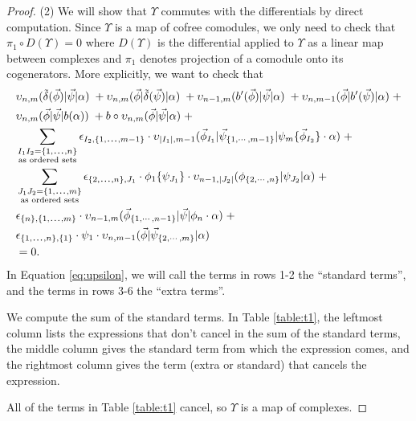 \begin{proof}
(2) We will show that $\Upsilon$ commutes with 
the differentials by direct computation. Since 
$\Upsilon$ is a map of cofree comodules, we only 
need to check that $\pi_1 \circ D(\Upsilon) = 0$ 
where $D(\Upsilon)$ is the differential applied 
to $\Upsilon$ as a linear map between complexes 
and $\pi_1$ denotes projection of a comodule 
onto its cogenerators. More explicitly, we want 
to check that
\begin{equation} \label{eq:upsilon}
\begin{aligned}
&\upsilon_{n, m} ( \tilde{\delta}(\vec{\phi}) | \vec{\psi} | \alpha ) \; + 
\upsilon_{n, m} ( \vec{\phi} | \tilde{\delta}(\vec{\psi}) | \alpha ) \; + 
\upsilon_{n-1, m} ( b^\prime(\vec{\phi}) | \vec{\psi} | \alpha ) \; + 
\upsilon_{n, m-1} ( \vec{\phi} | b^\prime(\vec{\psi}) | \alpha ) \; + \\
&\upsilon_{n, m} ( \vec{\phi} | \vec{\psi} | b(\alpha) ) \; + 
b \circ \upsilon_{n, m} ( \vec{\phi} | \vec{\psi} | \alpha ) \; + \\
& \sum \limits_{\substack{
  I_1I_2 = \{1,\smdots,n\}\\ 
  \textrm{as ordered sets}}}
  \epsilon_{I_2,\{1,\smdots,m-1\}}\cdot
  \upsilon_{|I_1|, m-1}(\vec{\phi}_{I_1} | \vec{\psi}_{\{1,\cdots, m-1\}} | \psi_{m} \{\vec{\phi}_{I_2}\} \cdot \alpha ) \; + \\
& \sum \limits_{\substack{
  J_1J_2 = \{1,\smdots,m\}\\ 
  \textrm{as ordered sets}}}
  \epsilon_{\{2,\smdots,n\},J_1}\cdot
\phi_1 \{ \psi_{J_1}\}\cdot \upsilon_{n-1, |J_2|}(\phi_{\{2,\cdots , n\}} | \psi_{J_2} | \alpha ) \; + \\  
& \epsilon_{\{n\},\{1,\smdots,m\}}\cdot
  \upsilon_{n-1, m}(\vec{\phi}_{\{1,\cdots, n-1\}} |\vec{\psi} | \phi_{n}\cdot \alpha) \; + \\
& \epsilon_{\{1,\smdots,n\},\{1\}}\cdot
\psi_1\cdot \upsilon_{n,m-1} ( \vec{\phi} | \vec{\psi}_{\{2,\cdots, m\}} | \alpha) \\ 
&= 0.
\end{aligned}
\end{equation}
In Equation \ref{eq:upsilon}, we will call the 
terms in rows 1-2 the ``standard terms'', 
and the terms in rows 3-6 the 
``extra terms''.

We compute the sum of the standard terms. 
In Table \ref{table:t1}, the leftmost column 
lists the expressions that don't cancel in 
the sum of the standard terms, the middle 
column gives the standard term from which 
the expression comes, and the rightmost 
column gives the term (extra or standard) 
that cancels the expression. 

All of the terms in Table \ref{table:t1} 
cancel, so $\Upsilon$ is a map of complexes.
\end{proof}
